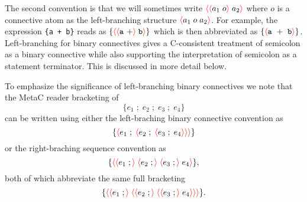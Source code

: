 \documentclass{article}
\newcommand{\mtt}[1]{\mbox{\tt #1}}
\newcommand{\fopen}{{\color{red} \langle}}
\newcommand{\fclose}{{\color{red} \rangle}}
\begin{document}
The second convention is that we will sometimes write $\fopen \fopen a_1 \;o\fclose\;a_2\fclose$ where $o$ is a connective atom
as the left-branching structure $\fopen a_1\;o\;a_2 \fclose$.  For example, the expression \mtt{\{a + b\}} reads as
$\{\fopen \fopen \mathtt{a~+} \fclose \;\mathtt{b} \fclose \}$ which is then abbreviated as
$\{\fopen \mathtt{a~+~b} \fclose \}$.  Left-branching for binary connectives gives a
C-consistent treatment of semicolon as a binary connective while also supporting the interpretation of semicolon as a statement terminator.
This is discussed in more detail below.

To emphasize the significance of left-branching binary connectives we note that
the MetaC reader bracketing of
$$\{e_1\;;\;e_2\;;\;e_3\;;\;e_4\}$$
can be written using either the left-braching binary connective convention as
$$\{\fopen e_1\;;\;\fopen e_2\;;\;\fopen e_3\;;\;e_4\fclose\fclose\fclose\}$$
or the right-braching sequence convention as
$$\{\fopen \fopen e_1\;;\fclose \;\fopen e_2\;;\fclose \;\fopen e_3\;;\fclose\;e_4\fclose\},$$
both of which abbreviate the same full bracketing
$$\{\fopen \fopen e_1\;;\fclose \;\fopen \fopen e_2\;;\fclose \;\fopen \fopen e_3\;;\fclose\;e_4\fclose\fclose\fclose\}.$$
\end{document}
